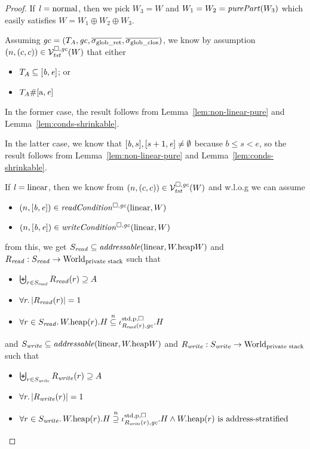 \begin{proof}

  If $\mathit{l} = \mathrm{normal}$, then we pick $W_3 = W$ and $W_1 = W_2 = \purePart{W_3}$ which easily satisfies $W = W_1 \oplus W_2 \oplus W_3$.

  Assuming $\mathit{gc} = (T_{A},\mathit{gc},\overline{\sigma_{\mathrm{glob\_ret}}},\overline{\sigma_{\mathrm{glob\_clos}}})$, we know by assumption $\left(n,(c,c)\right) \in \mathcal{V}^{\square,\mathit{gc}}_{\mathit{tst}}(W)$ that either
\begin{itemize}
\item $T_{A} \subseteq [\mathit{b},\mathit{e}]$; or
\item $T_{A} \# [\mathrm{a},\mathit{e}]$
\end{itemize}
In the former case, the result follows from Lemma~\ref{lem:non-linear-pure} and Lemma~\ref{lem:conds-shrinkable}.

In the latter case, we know that $[\mathit{b},s],[s+1,\mathit{e}] \neq \emptyset$ because $b \le s < e$, so the result follows from Lemma~\ref{lem:non-linear-pure} and Lemma~\ref{lem:conds-shrinkable}.

If $\mathit{l} = \mathrm{linear}$, then 
we know from $\left(n,(c,c)\right) \in \mathcal{V}^{\square,\mathit{gc}}_{\mathit{tst}}(W)$ and w.l.o.g we can assume
\begin{itemize}
\item $\npair{[\baddr,\eaddr]} \in \readCond{\linear,W}$
\item $\npair{[\baddr,\eaddr]} \in \writeCond{\linear,W}$
\end{itemize}
from this, we get $S_{\var{read}} \subseteq \addressable{\linear,\pwheap{W}}$ and
$R_{\mathit{read}} : S_{\mathit{read}} \rightarrow \mathrm{World}_\text{private stack}$ such that
\begin{itemize}
\item $\biguplus_{r\in S_{\mathit{read}}} R_{\mathit{read}}(r) \supseteq A$
\item $\forall r\ldotp |R_{\mathit{read}}(r)|  = 1$
\item $\forall r \in S_{\mathit{read}} \ldotp W.\mathrm{heap}(r).H \overset{n}{\subseteq} \iota^{\mathrm{std},\mathrm{p},\square}_{R_{\mathit{read}}(r),\mathit{gc}}.H$
\end{itemize}
and
$S_{\var{write}} \subseteq \addressable{\linear,\pwheap{W}}$ and
$R_{\mathit{write}} : S_{\mathit{write}} \rightarrow \mathrm{World}_\text{private stack}$ such that
\begin{itemize}
\item $\biguplus_{r\in S_{\mathit{write}}} R_{\mathit{write}}(r) \supseteq A$
\item $\forall r\ldotp |R_{\mathit{write}}(r)|  = 1$
\item $\forall r \in S_{\mathit{write}} \ldotp W.\mathrm{heap}(r).H \overset{n}{\supseteq}
  \iota^{\mathrm{std},\mathrm{p},\square}_{R_{\mathit{write}}(r),\mathit{gc}}.H \wedge W.\mathrm{heap}(r) \text{ is address-stratified}$
\end{itemize}


\end{proof}
